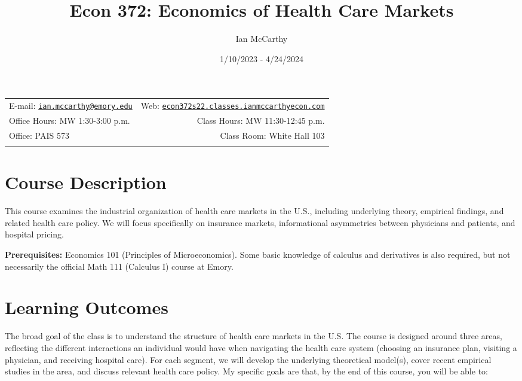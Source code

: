 \documentclass[11pt,]{article}
\title{Econ 372: Economics of Health Care Markets}
\author{Ian McCarthy}
\date{1/10/2023 - 4/24/2024}
\begin{document}
  

		\maketitle
		
	
		\thispagestyle{firststyle}



	\noindent \begin{tabular*}{\textwidth}{ @{\extracolsep{\fill}} lr @{\extracolsep{\fill}}}


E-mail: \texttt{\href{mailto:ian.mccarthy@emory.edu}{\nolinkurl{ian.mccarthy@emory.edu}}} & Web: \href{http://econ372s22.classes.ianmccarthyecon.com}{\tt econ372s22.classes.ianmccarthyecon.com}\\
Office Hours: MW 1:30-3:00 p.m.  &  Class Hours: MW 11:30-12:45 p.m.\\
Office: PAIS 573  & Class Room: White Hall 103\\
	&  \\
	\hline
	\end{tabular*}
	
\vspace{2mm}
	


\hypertarget{course-description}{%
\section{Course Description}\label{course-description}}

This course examines the industrial organization of health care markets
in the U.S., including underlying theory, empirical findings, and
related health care policy. We will focus specifically on insurance
markets, informational asymmetries between physicians and patients, and
hospital pricing.

\textbf{Prerequisites:} Economics 101 (Principles of Microeconomics).
Some basic knowledge of calculus and derivatives is also required, but
not necessarily the official Math 111 (Calculus I) course at Emory.

\hypertarget{learning-outcomes}{%
\section{Learning Outcomes}\label{learning-outcomes}}

The broad goal of the class is to understand the structure of health
care markets in the U.S. The course is designed around three areas,
reflecting the different interactions an individual would have when
navigating the health care system (choosing an insurance plan, visiting
a physician, and receiving hospital care). For each segment, we will
develop the underlying theoretical model(s), cover recent empirical
studies in the area, and discuss relevant health care policy. My
specific goals are that, by the end of this course, you will be able to:
\end{document}

